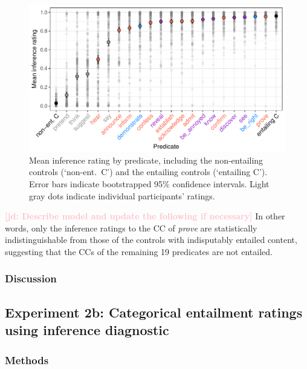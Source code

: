 \documentclass[11pt,fleqn]{article}
\newcommand{\jd}[1]{\textbf{\textcolor{Pink}{[jd: #1]}}}
\newcommand{\6}{\mbox{$[\hspace*{-.6mm}[$}}
\newcommand{\9}{\mbox{$]\hspace*{-.6mm}]$}}
\begin{document}
\begin{figure}[h!]
\centering

\includegraphics[width=.7\paperwidth]{../../results/4-veridicality3/graphs/means-inference-by-predicate-variability}

\caption{Mean inference rating by predicate, including the non-entailing controls (`non-ent.\ C') and the entailing controls (`entailing C'). Error bars indicate bootstrapped 95\% confidence intervals. Light gray dots indicate individual participants' ratings.} %
\label{f-veridicality-predicate}
\end{figure}

\jd{Describe model and update the following if necessary} In other words, only the inference ratings to the CC of {\em prove} are statistically indistinguishable from those of the controls with indisputably entailed content, suggesting that the CCs of the remaining 19 predicates are not entailed.

\subsubsection{Discussion}



\subsection{Experiment 2b: Categorical entailment ratings using inference diagnostic}

\subsubsection{Methods}
\end{document}
